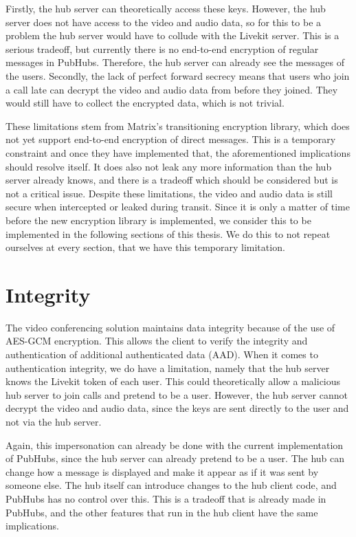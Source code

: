 \documentclass{report}
\begin{document}
Firstly, the hub server can theoretically access these
keys. However, the hub server does not have access to the video and audio data, so for this to be a problem the hub
server would have to collude with the Livekit server. This is a serious tradeoff, but currently there is no end-to-end
encryption of regular messages in PubHubs. Therefore, the hub server can already see the messages of the users. Secondly,
the lack of perfect forward secrecy means that users who join a call late can decrypt the video and audio data from
before they joined. They would still have to collect the encrypted data, which is not trivial.

These limitations stem from Matrix's transitioning encryption library, which does not yet support end-to-end
encryption of direct messages. This is a temporary constraint and once they have implemented that, the
aforementioned implications should resolve itself. It does also not leak any more information than the hub server
already knows, and there is a tradeoff which should be considered but is not a critical issue. Despite these limitations,
the video and audio data is still secure when intercepted or leaked during transit. Since it is only a matter of time
before the new encryption library is implemented, we consider this to be implemented in the following sections of this
thesis. We do this to not repeat ourselves at every section, that we have this temporary limitation.

\section{Integrity}
The video conferencing solution maintains data integrity because of the use of AES-GCM encryption. This allows the
client to verify the integrity and authentication of additional authenticated data (AAD). When it comes to
authentication integrity, we do have a limitation, namely that the hub server knows the Livekit token of each user.
This could theoretically allow a malicious hub server to join calls and pretend to be a user. However, the hub
server cannot decrypt the video and audio data, since the keys are sent directly to the user and not via the hub server.

Again, this impersonation can already be done with the current implementation of PubHubs, since the hub server can
already pretend to be a user. The hub can change how a message is displayed and make it appear as if it was sent by
someone else. The hub itself can introduce changes to the hub client code, and PubHubs has no control over this.
This is a tradeoff that is already made in PubHubs, and the other features that run in the hub client have the same
implications.
\end{document}
